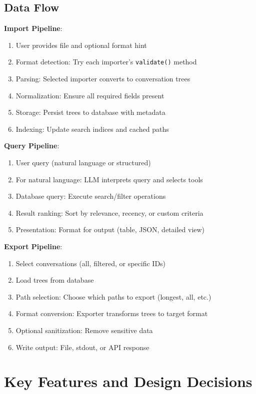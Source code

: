 \documentclass[11pt,letterpaper]{article}
\begin{document}
\subsection{Data Flow}

\textbf{Import Pipeline}:
\begin{enumerate}
    \item User provides file and optional format hint
    \item Format detection: Try each importer's \texttt{validate()} method
    \item Parsing: Selected importer converts to conversation trees
    \item Normalization: Ensure all required fields present
    \item Storage: Persist trees to database with metadata
    \item Indexing: Update search indices and cached paths
\end{enumerate}

\textbf{Query Pipeline}:
\begin{enumerate}
    \item User query (natural language or structured)
    \item For natural language: LLM interprets query and selects tools
    \item Database query: Execute search/filter operations
    \item Result ranking: Sort by relevance, recency, or custom criteria
    \item Presentation: Format for output (table, JSON, detailed view)
\end{enumerate}

\textbf{Export Pipeline}:
\begin{enumerate}
    \item Select conversations (all, filtered, or specific IDs)
    \item Load trees from database
    \item Path selection: Choose which paths to export (longest, all, etc.)
    \item Format conversion: Exporter transforms trees to target format
    \item Optional sanitization: Remove sensitive data
    \item Write output: File, stdout, or API response
\end{enumerate}

\section{Key Features and Design Decisions}
\label{sec:features}
\end{document}
